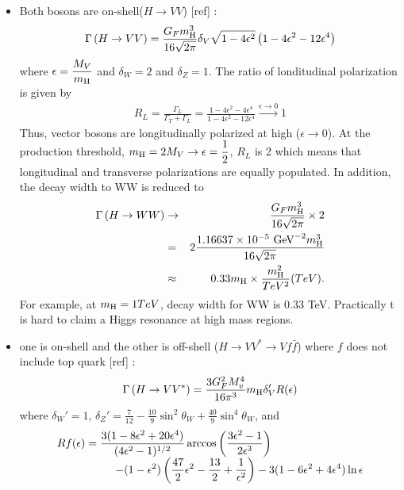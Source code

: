 \begin{itemize} 
%
\item  Both bosons are on-shell($ H \rightarrow VV$) [ref] : 
\begin{eqnarray} 
\Gamma \left( H \rightarrow VV \right) 
= 
\frac{G_F m_{\mathrm{H}}^3}{16\sqrt{2\pi}} \delta_V \sqrt{1-4\epsilon^2} 
\left( 1 - 4\epsilon^2 - 12\epsilon^4 \right)
\end{eqnarray} 
where $\displaystyle \epsilon = \frac{M_V}{m_{\mathrm{H}}}$ and $\delta_W=2$ and $\delta_Z=1$.
The ratio of londitudinal polarization is given by \cite{PhysRevD.49.79}
\begin{eqnarray} 
R_L 
= 
\frac{\Gamma_L}{\Gamma_T + \Gamma_L}    
= 
\frac{1 - 4\epsilon^2 - 4\epsilon^4}{1 - 4\epsilon^2 - 12\epsilon^4} 
\xrightarrow{\epsilon \rightarrow 0}{} 1
\end{eqnarray} 
Thus, vector bosons are longitudinally polarized at high \mHi{} ($\epsilon \rightarrow 0$). 
At the production threshold, $\displaystyle m_{\mathrm{H}} = 2M_V \rightarrow \epsilon = \frac{1}{2}$, 
$R_L$ is 2 which means that longitudinal and transverse polarizations are equally populated. 
In addition, the decay width to WW is reduced to 
\begin{eqnarray} 
\Gamma \left( H \rightarrow WW \right)
&\rightarrow&
\frac{G_F m_{\mathrm{H}}^3}{16\sqrt{2\pi}} \times 2 \\
&=&  
2 \frac{ 1.16637 \times 10^{-5}~\mathrm{Ge\kern -0.1em V}^{-2} m_{\mathrm{H}}^3}{16\sqrt{2\pi}} \\
&\approx&
0.33 m_{\mathrm{H}} \times \frac{m_{\mathrm{H}}^2}{TeV^2} (TeV).   
\end{eqnarray} 
For example, at $m_{\mathrm{H}}=1TeV$, decay width for WW is 0.33 TeV.
Practically t is hard to claim a Higgs resonance at high mass regions.  
%
\item  one is on-shell and the other is off-shell 
       ($ H \rightarrow VV^* \rightarrow Vf\bar{f}$) where $f$ does not include top quark [ref] : 
\begin{eqnarray} 
\Gamma \left( H \rightarrow VV^* \right) 
=
\frac{3G_F^2 M_v^4}{16\pi^3} m_{\mathrm{H}} \delta_V' R(\epsilon)
\end{eqnarray} 
where $\delta_W'=1$, $\displaystyle \delta_Z'=\frac{7}{12}-\frac{10}{9}\sin^2\theta_W 
+ \frac{40}{9}\sin^4\theta_W$, and 
\begin{eqnarray}   
\begin{array}{ccc} \multicolumn{2}{c}{\displaystyle 
Rf(\epsilon) = \frac{3(1-8\epsilon^2+20\epsilon^4)}{(4\epsilon^2-1)^{1/2}} 
                \arccos \left( \frac{3\epsilon^2-1}{2\epsilon^3} \right)  
} & \\ & \multicolumn{2}{c}{\hspace{1.5cm} \displaystyle
- (1-\epsilon^2)\left( \frac{47}{2}\epsilon^2 - \frac{13}{2} + \frac{1}{\epsilon^2} \right)  
- 3(1-6\epsilon^2+4\epsilon^4) \ln \epsilon
} \end{array}      
\end{eqnarray} 
\end{itemize} 
